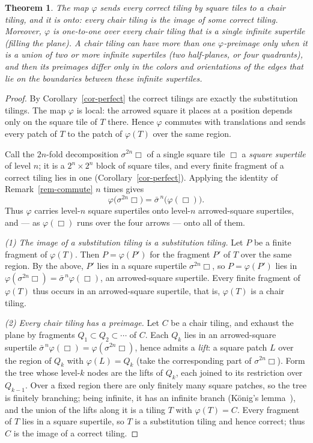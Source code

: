 \documentclass[11pt]{article}
\newtheorem{theorem}{Theorem}
\theoremstyle{remark}
\begin{document}
\begin{theorem}\label{th-chair}
The map $\varphi$ sends every correct tiling by square tiles to a chair tiling,
and it is \emph{onto}: every chair tiling is the image of some correct tiling.
Moreover, $\varphi$ is one-to-one over every chair tiling that is a single
infinite supertile (filling the plane). A chair tiling can have more than one
$\varphi$-preimage only when it is a union of two or more infinite supertiles
(two half-planes, or four quadrants), and then its preimages differ only in the
colors and orientations of the edges that lie on the boundaries between these
infinite supertiles.
\end{theorem}

\begin{proof}
By Corollary~\ref{cor-perfect} the correct tilings are exactly the substitution
tilings. The map $\varphi$ is local: the arrowed square it places at a position
depends only on the square tile of $T$ there. Hence $\varphi$ commutes with
translations and sends every patch of $T$ to the patch of $\varphi(T)$ over the
same region.

Call the $2n$-fold decomposition $\sigma^{2n}\Box$ of a single square tile
$\Box$ a \emph{square supertile} of level $n$; it is a $2^n\times2^n$ block of
square tiles, and every finite fragment of a correct tiling lies in one
(Corollary~\ref{cor-perfect}). Applying the identity of Remark~\ref{rem-commute}
$n$ times gives
$$
\varphi\big(\sigma^{2n}\Box\big)=\bar\sigma^{\,n}\big(\varphi(\Box)\big).
$$
Thus $\varphi$ carries level-$n$ square supertiles onto level-$n$ arrowed-square
supertiles, and --- as $\varphi(\Box)$ runs over the four arrows --- onto all of
them.

\smallskip
\noindent\emph{(1) The image of a substitution tiling is a substitution tiling.}
Let $P$ be a finite fragment of $\varphi(T)$. Then $P=\varphi(P')$ for the
fragment $P'$ of $T$ over the same region. By the above, $P'$ lies in a square
supertile $\sigma^{2n}\Box$, so $P=\varphi(P')$ lies in
$\varphi(\sigma^{2n}\Box)=\bar\sigma^{\,n}\varphi(\Box)$, an arrowed-square
supertile. Every finite fragment of $\varphi(T)$ thus occurs in an arrowed-square
supertile, that is, $\varphi(T)$ is a chair tiling.

\smallskip
\noindent\emph{(2) Every chair tiling has a preimage.}
Let $C$ be a chair tiling, and exhaust the plane by fragments $Q_1\subset
Q_2\subset\cdots$ of $C$. Each $Q_k$ lies in an arrowed-square supertile
$\bar\sigma^{\,n}\varphi(\Box)=\varphi(\sigma^{2n}\Box)$, hence admits a
\emph{lift}: a square patch $L$ over the region of $Q_k$ with $\varphi(L)=Q_k$
(take the corresponding part of $\sigma^{2n}\Box$). Form the tree whose level-$k$
nodes are the lifts of $Q_k$, each joined to its restriction over $Q_{k-1}$.
Over a fixed region there are only finitely many square patches, so the tree is
finitely branching; being infinite, it has an infinite branch (König's
lemma~\cite{koenig}), and the union of the lifts along it is a tiling $T$ with
$\varphi(T)=C$. Every
fragment of $T$ lies in a square supertile, so $T$ is a substitution tiling and
hence correct; thus $C$ is the image of a correct tiling.


\end{proof}
\end{document}
